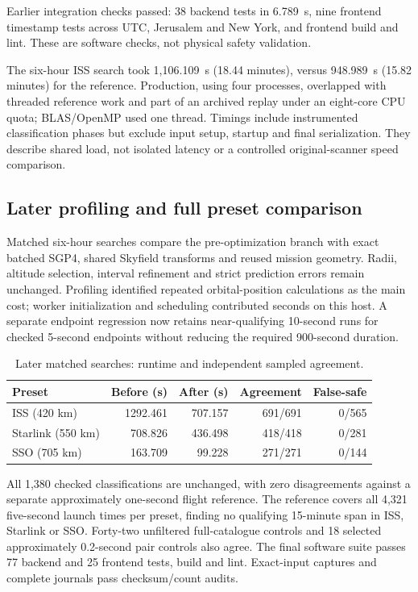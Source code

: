 \documentclass[11pt,a4paper]{article}
\begin{document}
Earlier integration checks passed: 38 backend tests in 6.789~s, nine frontend
timestamp tests across UTC, Jerusalem and New York, and frontend build
and lint. These are software checks, not physical safety validation.

The six-hour ISS search took 1,106.109~s (18.44 minutes), versus
948.989~s (15.82 minutes) for the reference. Production, using four
processes, overlapped with threaded reference work and part of an archived
replay under an eight-core CPU quota; BLAS/OpenMP used one thread.
Timings include instrumented classification phases but exclude input
setup, startup and final serialization. They describe shared load, not
isolated latency or a controlled original-scanner speed comparison.

\subsection{Later profiling and full preset comparison}

Matched six-hour searches compare the pre-optimization branch with exact
batched SGP4, shared Skyfield transforms and reused mission geometry. Radii,
altitude selection, interval refinement and strict prediction errors remain
unchanged. Profiling identified repeated orbital-position calculations as
the main cost; worker initialization and scheduling contributed seconds on
this host. A separate endpoint regression now retains near-qualifying
10-second runs for checked 5-second endpoints without reducing the required
900-second duration.

\begin{table}[htbp]
\centering
\small
\caption{Later matched searches: runtime and independent sampled agreement.}
\label{tab:performance}
\begin{tabular}{lrrrr}
\toprule
Preset & Before (s) & After (s) & Agreement & False-safe \\
\midrule
ISS (420 km) & 1292.461 & 707.157 & 691/691 & 0/565 \\
Starlink (550 km) & 708.826 & 436.498 & 418/418 & 0/281 \\
SSO (705 km) & 163.709 & 99.228 & 271/271 & 0/144 \\
\bottomrule
\end{tabular}
\end{table}

All 1,380 checked classifications are unchanged, with zero disagreements
against a separate approximately one-second flight reference. The reference
covers all 4,321 five-second launch times per preset, finding no qualifying
15-minute span in ISS, Starlink or SSO. Forty-two unfiltered full-catalogue
controls and 18 selected approximately 0.2-second pair controls also agree.
The final software suite passes 77 backend and 25 frontend tests, build and
lint. Exact-input captures and complete journals pass checksum/count audits.
\end{document}
